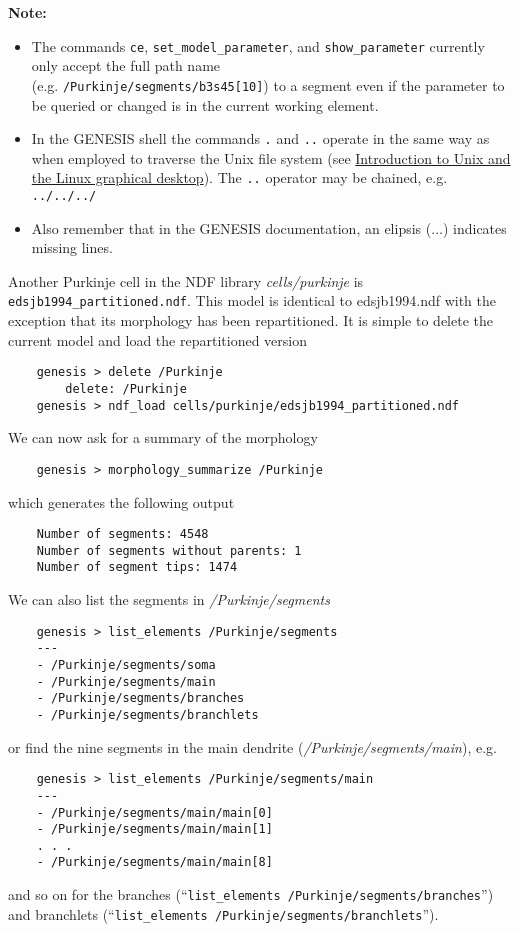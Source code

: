 \documentclass[12pt]{article}
\begin{document}
{\bf Note:}
\begin{itemize}

\item The commands {\tt ce}, {\tt set\_model\_parameter}, and {\tt show\_parameter} currently only accept the full path name\\(e.g. {\tt  /Purkinje/segments/b3s45[10]}) to a segment even if the parameter to be queried or changed is in the current working element. %

\item In the GENESIS shell the commands {\tt .} and {\tt ..} operate in the same way as when employed to traverse the Unix file system (see \href{../unix-linux/unix-linux.tex}{Introduction to Unix and the Linux graphical desktop}). The {\tt ..} operator may be chained, e.g. {\tt ../../../}

\item Also remember that in the GENESIS documentation, an elipsis ($\ldots$) indicates missing lines.

\end{itemize}

Another Purkinje cell in the NDF library {\it cells/purkinje} is {\tt edsjb1994\_partitioned.ndf}. This model is identical to edsjb1994.ndf with the exception that its morphology has been repartitioned. It is simple to delete the current model and load the repartitioned version
\begin{verbatim}
    genesis > delete /Purkinje
        delete: /Purkinje
    genesis > ndf_load cells/purkinje/edsjb1994_partitioned.ndf
\end{verbatim}
We can now ask for a summary of the morphology
\begin{verbatim}
    genesis > morphology_summarize /Purkinje
\end{verbatim}
which generates the following output
\begin{verbatim}
    Number of segments: 4548
    Number of segments without parents: 1
    Number of segment tips: 1474
\end{verbatim}
We can also list the segments in {\it /Purkinje/segments}
\begin{verbatim}
    genesis > list_elements /Purkinje/segments
    ---
    - /Purkinje/segments/soma
    - /Purkinje/segments/main
    - /Purkinje/segments/branches
    - /Purkinje/segments/branchlets
\end{verbatim}
or find the nine segments in the main dendrite ({\it /Purkinje/segments/main}), e.g.
\begin{verbatim}
    genesis > list_elements /Purkinje/segments/main
    ---
    - /Purkinje/segments/main/main[0]
    - /Purkinje/segments/main/main[1]
    . . . 
    - /Purkinje/segments/main/main[8]
\end{verbatim}
and so on for the branches (``{\tt list\_elements /Purkinje/segments/branches}'') and branchlets (``{\tt list\_elements /Purkinje/segments/branchlets}'').
\end{document}
